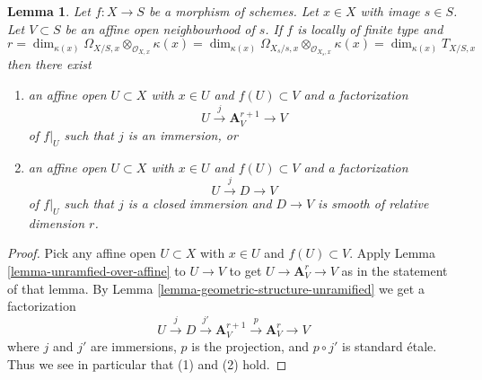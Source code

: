 \documentclass[10pt,a4paper]{amsart}
\theoremstyle{plain}
\newtheorem{lemma}[subsection]{Lemma}
\theoremstyle{definition}
\theoremstyle{remark}
\numberwithin{equation}{subsection}
\begin{document}
\begin{lemma}
\label{lemma-immersion-into-affine}
Let $f : X \to S$ be a morphism of schemes.
Let $x \in X$ with image $s \in S$. Let $V \subset S$ be
an affine open neighbourhood of $s$. If $f$ is locally of
finite type and
$$
r =
\dim_{\kappa(x)} \Omega_{X/S, x} \otimes_{\mathcal{O}_{X, x}} \kappa(x) =
\dim_{\kappa(x)} \Omega_{X_s/s, x} \otimes_{\mathcal{O}_{X_s, x}} \kappa(x) =
\dim_{\kappa(x)} T_{X/S, x}
$$
then there exist
\begin{enumerate}
\item an affine open $U \subset X$ with $x \in U$ and $f(U) \subset V$ and a
factorization
$$
U \xrightarrow{j} \mathbf{A}^{r + 1}_V \to V
$$
of $f|_U$ such that $j$ is an immersion, or
\item an affine open $U \subset X$ with $x \in U$ and $f(U) \subset V$ and a
factorization
$$
U \xrightarrow{j} D \to V
$$
of $f|_U$ such that $j$ is a closed immersion and $D \to V$
is smooth of relative dimension $r$.
\end{enumerate}
\end{lemma}

\begin{proof}
Pick any affine open $U \subset X$ with $x \in U$ and $f(U) \subset V$.
Apply Lemma \ref{lemma-unramfied-over-affine} to $U \to V$ to
get $U \to \mathbf{A}^r_V \to V$ as in the statement of that lemma.
By Lemma \ref{lemma-geometric-structure-unramified}
we get a factorization
$$
U \xrightarrow{j} D \xrightarrow{j'} \mathbf{A}^{r + 1}_V
\xrightarrow{p} \mathbf{A}^r_V \to V
$$
where $j$ and $j'$ are immersions, $p$ is the projection, and
$p \circ j'$ is standard \'etale. Thus we see in particular that
(1) and (2) hold.
\end{proof}
\end{document}
